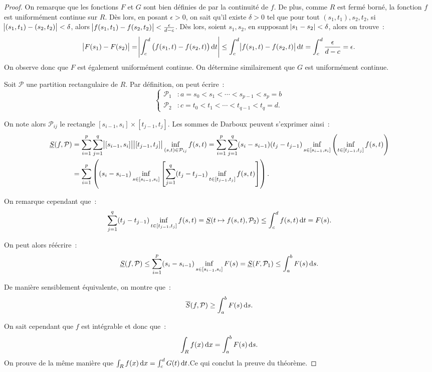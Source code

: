 \documentclass{article}
\theoremstyle{definition}
\theoremstyle{remark}
\begin{document}
		\begin{proof} On remarque que les fonctions $F$ et $G$ sont bien définies de par la continuité de $f$. De plus, comme $R$ est fermé borné, la fonction
		$f$ est uniformément continue sur $R$. Dès lors, en posant $\epsilon > 0$, on sait qu'il existe $\delta > 0$ tel que pour tout $(s_1, t_1), s_2, t_2$,
		si $\abs {(s_1, t_1)-(s_2, t_2)} < \delta$, alors $\abs{f(s_1, t_1) - f(s_2, t_2)} < \frac \epsilon{d-c}$. Dès lors, soient $s_1, s_2$, en supposant
		$\abs{s_1-s_2} < \delta$, alors on trouve~:
		\[\abs{F(s_1) - F(s_2)} = \abs{\int_c^d\left(f(s_1, t) - f(s_2, t)\right)\dif t} \leq \int_c^d\abs{f(s_1, t)-f(s_2, t)}\dif t
		= \int_c^d\frac \epsilon{d-c} = \epsilon.\]
		On observe donc que $F$ est également uniformément continue. On détermine similairement que $G$ est uniformément continue.

		Soit $\mathcal P$ une partition rectangulaire de $R$. Par définition, on peut écrire~:
		\[\begin{cases}
			\mathcal P_1 &: a = s_0 < s_1 < \dotsb < s_{p-1} < s_p = b \\
			\mathcal P_2 &: c = t_0 < t_1 < \dotsb < t_{q-1} < t_q = d.
		\end{cases}\]

		On note alors $\mathcal P_{ij}$ le rectangle $[s_{i-1}, s_i] \times [t_{j-1}, t_j]$. Les sommes de Darboux peuvent s'exprimer ainsi~:
		\begin{align*}
			\underline S(f, \mathcal P) &= \sum_{i=1}^p\sum_{j=1}^q\abs{[s_{i-1}, s_i]}\abs{[t_{j-1}, t_j]}\inf_{(s, t)\in \mathcal P_{ij}}f(s, t)
			= \sum_{i=1}^p\sum_{j=1}^q(s_i - s_{i-1})(t_j-t_{j-1})\inf_{s \in [s_{i-1}, s_i]}\left(\inf_{t \in [t_{j-1}, t_j]}f(s, t)\right) \\
			&= \sum_{i=1}^p\left((s_i-s_{i-1})\inf_{s \in [s_{i-1}, s_i]}\left[\sum_{j=1}^q(t_j-t_{j-1})\inf_{t \in [t_{j-1}, t_j]}f(s, t)\right]\right).
		\end{align*}

		On remarque cependant que~:
		\[\sum_{j=1}^q(t_j-t_{j-1})\inf_{t \in [t_{j-1}, t_j]}f(s, t) = \underline S(t \mapsto f(s, t), \mathcal P_2) \leq \int_c^df(s, t)\dif t = F(s).\]

		On peut alors réécrire~:
		\[\underline S(f, \mathcal P) \leq \sum_{i=1}^p(s_i-s_{i-1})\inf_{s \in [s_{i-1}, s_i]}F(s) = \underline S(F, \mathcal P_1) \leq \int_a^bF(s)\dif s.\]

		De manière sensiblement équivalente, on montre que~:
		\[\overline S(f, \mathcal P) \geq \int_a^bF(s)\dif s.\]

		On sait cependant que $f$ est intégrable et donc que~:
		\[\int_R f(x)\dif x = \int_a^b F(s)\dif s.\]
		On prouve de la même manière que $\int_R f(x)\dif x = \int_c^dG(t)\dif t$.Ce qui conclut la preuve du théorème.
		\end{proof}
\end{document}
